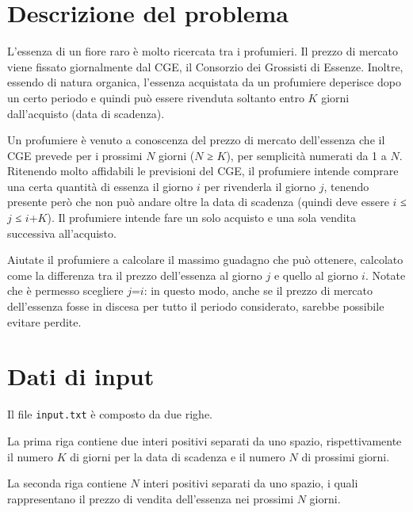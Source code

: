\documentclass[a4paper,11pt]{article}
\begin{document}
\vspace{0.5cm}



\vspace{0.5cm}

\section*{Descrizione del problema}
   
L'essenza di un fiore raro è molto ricercata tra i
profumieri. Il prezzo di mercato viene fissato giornalmente dal CGE,
il Consorzio dei Grossisti di Essenze.  Inoltre, essendo di natura
organica, l'essenza acquistata da un profumiere deperisce dopo un
certo periodo e quindi può essere rivenduta soltanto
entro $K$ giorni dall'acquisto (data di scadenza).

Un profumiere è venuto a conoscenza del prezzo di
mercato dell'essenza che il CGE prevede per i prossimi $N$ giorni
($N$ ≥ $K$), per semplicità
numerati da 1 a $N$. Ritenendo molto affidabili le
previsioni del CGE, il profumiere intende comprare una certa
quantità di essenza il giorno $i$ per rivenderla il
giorno $j$, tenendo presente però che non può
andare oltre la data di scadenza (quindi deve essere $i$
≤ $j$ ≤ $i$+$K$). Il profumiere
intende fare un solo acquisto e una sola vendita successiva
all'acquisto. 

Aiutate il profumiere a calcolare il massimo guadagno che può
ottenere, calcolato come la differenza tra il prezzo dell'essenza al
giorno $j$ e quello al giorno $i$. Notate che
è permesso scegliere $j$=$i$: in questo modo,
anche se il prezzo di mercato dell'essenza fosse in discesa per tutto
il periodo considerato, sarebbe possibile evitare perdite.


\section*{Dati di input}
  
Il file \texttt{input.txt} è composto da due righe.

La prima riga contiene due interi positivi separati da uno spazio,
rispettivamente il numero $K$ di giorni per la data di
scadenza e il numero $N$ di prossimi giorni.

La seconda riga contiene $N$ interi positivi separati da uno
spazio, i quali rappresentano il prezzo di vendita dell'essenza nei
prossimi $N$ giorni.
\end{document}
